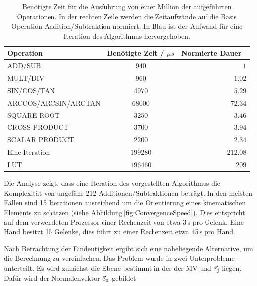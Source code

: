 \begin{table}[h]
    \centering
    \begin{tabular}[h]{l|c|r}
        \rowcolor{gray}Operation & Benötigte Zeit / $\mu s$ & Normierte Dauer\, \, \\
        \hline
        ADD/SUB & $940$ & $1$ \\
        \hline
        \rowcolor{lightgray}MULT/DIV & $960$ & $1.02$\\
        \hline
        SIN/COS/TAN & $4970$ & $5.29$ \\
        \hline
        \rowcolor{lightgray}ARCCOS/ARCSIN/ARCTAN & $68 000$ & $72.34$\\
        \hline
        SQUARE ROOT & $3250$ & $3.46$\\
        \hline
        \rowcolor{lightgray}$\text{CROSS PRODUCT}$ &$3700$&$3.94$\\
        \hline
        $\text{SCALAR PRODUCT}$ & $2200$&$2.34$\\
        \hline
        \rowcolor{blue!50}$\text{Eine Iteration}$ & $199280$& $212.08 $\\  
        \hline
        \rowcolor{red!50}$\text{LUT}$ & $196460$& $209 $\\
    \end{tabular}
    \caption{Benötigte Zeit für die Ausführung von einer Million der aufgeführten Operationen. In der rechten Zeile werden die Zeitaufwände auf die Basis Operation Addition/Subtraktion normiert. In Blau ist der Aufwand für eine Iteration des Algorithmus hervorgehoben.}
    \label{Tab:efficiency}
    \end{table}

Die Analyse zeigt, dass eine Iteration des vorgestellten Algorithmus die Komplexität von ungefähr 212 Additionen/Subtraktionen beträgt. In den meisten Fällen sind 15 Iterationen ausreichend um die Orientierung eines kinematischen Elements zu schätzen (siehe Abbildung\,\ref{fig:ConvergenceSpeed}). Dies entspricht auf dem verwendeten Prozessor einer Rechenzeit von etwa 3\,{\textmu}s pro Gelenk. Eine Hand besitzt 15 Gelenke, dies führt zu einer Rechenzeit etwa 45\,{\textmu}s pro Hand. 

Nach Betrachtung der Eindeutigkeit ergibt sich eine naheliegende Alternative, um die Berechnung zu vereinfachen. Das Problem wurde in zwei Unterprobleme unterteilt. Es wird zunächst die Ebene bestimmt in der der MV und $\vec{r}_{\textrm{\footnotesize{j}}}$ liegen. Dafür wird der Normalenvektor $\vec{e}_{\textrm{\footnotesize{n}}}$ gebildet
    
